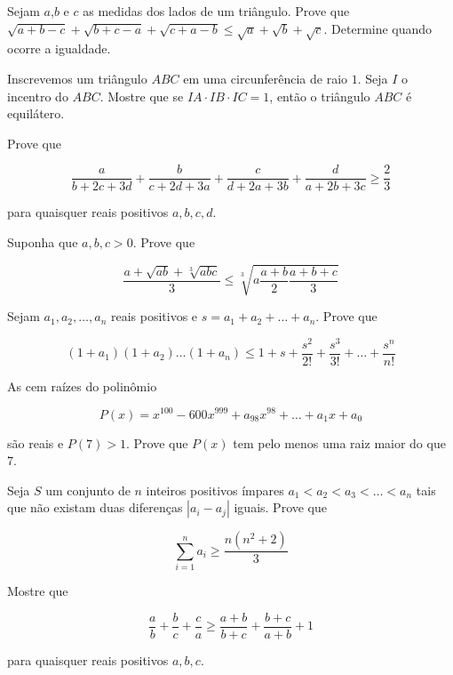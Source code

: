 \begin{questao}
  Sejam $a$,$b$ e $c$ as medidas dos lados de um triângulo. Prove que
  $\sqrt{a+b-c} + \sqrt{b+c-a} + \sqrt{c+a-b} \leq \sqrt{a} + \sqrt{b} +
  \sqrt{c}$. Determine quando ocorre a igualdade.
\end{questao}

\begin{questao}
  Inscrevemos um triângulo $ABC$ em uma circunferência de raio $1$. Seja $I$ o
  incentro do $ABC$. Mostre que se $IA \cdot IB \cdot IC = 1$, então o triângulo
  $ABC$ é equilátero.
\end{questao}

\begin{questao}
  Prove que

  $$ \frac{a}{b+2c+3d} + \frac{b}{c+2d+3a} + \frac{c}{d+2a+3b} +
  \frac{d}{a+2b+3c} \geq \frac{2}{3} $$

  para quaisquer reais positivos $a,b,c,d$.
\end{questao}

\begin{questao}
  Suponha que $a,b,c > 0$. Prove que

  $$ \frac{a+\sqrt{ab}+\sqrt[3]{abc}}{3} \leq \sqrt[3]{a \frac{a+b}{2}
    \frac{a+b+c}{3}} $$
\end{questao}

\begin{questao}
  Sejam $a_1,a_2,\ldots,a_n$ reais positivos e $s = a_1+a_2+\ldots+a_n$. Prove
  que

  $$ (1+a_1)(1+a_2)\ldots(1+a_n) \leq
  1+s+\frac{s^2}{2!}+\frac{s^3}{3!}+\ldots+\frac{s^n}{n!} $$
\end{questao}

\begin{questao}
  As cem raízes do polinômio

  $$P(x) = x^{100}-600x^{999}+a_{98}x^{98}+\ldots+a_1x+a_0$$

  são reais e $P(7) > 1$. Prove que $P(x)$ tem pelo menos uma raiz maior do que
  $7$.
\end{questao}

\begin{questao}
  Seja $S$ um conjunto de $n$ inteiros positivos ímpares $a_1<a_2<a_3 < \ldots <
  a_n $ tais que não existam duas diferenças $|a_i-a_j|$ iguais. Prove que

  $$\sum_{i=1}^{n}a_i \geq \frac{n(n^2+2)}{3}$$
\end{questao}

\begin{questao}
  Mostre que

  $$ \frac{a}{b} + \frac{b}{c} + \frac{c}{a} \geq \frac{a+b}{b+c} +
  \frac{b+c}{a+b} + 1 $$

  para quaisquer reais positivos $a,b,c$.
\end{questao}

